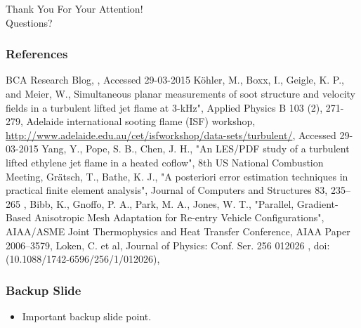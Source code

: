 \documentclass{beamer}
\begin{document}
\begin{frame}
\begin{center}
{\huge Thank You For Your Attention!} \\
\vspace*{1.5cm}
{\Large Questions?}
\end{center}
\end{frame}

\appendix
{}
\setcounter{finalframe}{\value{framenumber}}

\begin{frame}[allowframebreaks] 
\frametitle{References}
\begin{thebibliography}{1} %
\begin{tiny}
\beamertemplatetextbibitems
{}
BCA Research Blog, , \newblock Accessed 29-03-2015
K{\"o}hler, M., Boxx, I., Geigle, K. P., and Meier, W., \newblock Simultaneous planar measurements of soot structure and velocity fields in a turbulent lifted jet flame at 3-kHz", \newblock Applied Physics B 103 (2), 271-279,   
Adelaide international sooting flame (ISF) workshop, \newblock \url{http://www.adelaide.edu.au/cet/isfworkshop/data-sets/turbulent/}, \newblock Accessed 29-03-2015
Yang, Y., Pope, S. B., Chen, J. H., \newblock "An LES/PDF study of a turbulent lifted ethylene jet flame in a heated coflow", \newblock 8th US National Combustion Meeting, 
Gr{\"a}tsch, T., Bathe, K. J., \newblock "A posteriori error estimation techniques in practical finite element analysis", \newblock Journal of Computers and Structures 83, 235–265 , 
Bibb, K., Gnoffo, P. A., Park, M. A., Jones, W. T., \newblock "Parallel, Gradient-Based Anisotropic Mesh Adaptation for Re-entry Vehicle Configurations", \newblock AIAA/ASME Joint Thermophysics and Heat Transfer Conference, AIAA Paper 2006–3579,  
Loken, C. et al, \newblock  Journal of Physics: Conf. Ser. 256 012026 , \newblock doi: (10.1088/1742-6596/256/1/012026), 

\end{tiny}
\end{thebibliography}
\end{frame}


\begin{frame}
\frametitle{Backup Slide}

\begin{itemize}
\item Important backup slide point.
\end{itemize}

\end{frame}

\setcounter{framenumber}{\value{finalframe}}
\end{document}
